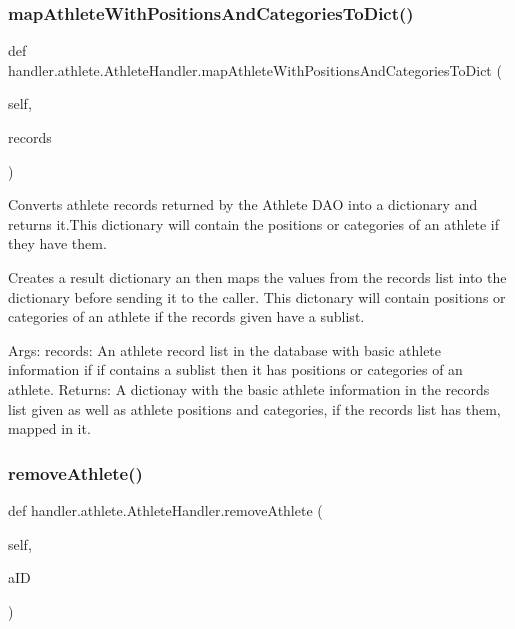 \subsubsection{\texorpdfstring{map\+Athlete\+With\+Positions\+And\+Categories\+To\+Dict()}{mapAthleteWithPositionsAndCategoriesToDict()}}
{\footnotesize\ttfamily def handler.\+athlete.\+Athlete\+Handler.\+map\+Athlete\+With\+Positions\+And\+Categories\+To\+Dict (\begin{DoxyParamCaption}\item[{}]{self,  }\item[{}]{records }\end{DoxyParamCaption})}

\begin{DoxyVerb}Converts athlete records returned by the Athlete DAO into a dictionary 
and returns it.This dictionary will contain the positions or categories
of an athlete if they have them.

Creates a result dictionary an then maps the values from the records 
list into the dictionary before sending it to the caller. This dictonary 
will contain positions or categories of an athlete if the records given have
a sublist.
     

Args:
    records: An athlete record list in the database with basic athlete information if
     if contains a sublist then it has positions or categories of an athlete.
Returns:
    A dictionay with the basic athlete information in the records list given as well
    as athlete positions and categories, if the records list has them, mapped in it.
\end{DoxyVerb}
 \mbox{\label{classhandler_1_1athlete_1_1_athlete_handler_a9f3ea8fb6c3c156f89c2b2a5bda6e689}} 
\subsubsection{\texorpdfstring{remove\+Athlete()}{removeAthlete()}}
{\footnotesize\ttfamily def handler.\+athlete.\+Athlete\+Handler.\+remove\+Athlete (\begin{DoxyParamCaption}\item[{}]{self,  }\item[{}]{a\+ID }\end{DoxyParamCaption})}

